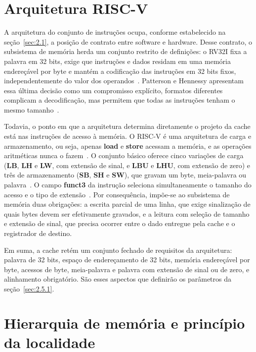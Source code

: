 \section{Arquitetura RISC-V}\label{sec:2.3}

A arquitetura do conjunto de instruções ocupa, conforme estabelecido na seção~\ref{sec:2.1}, a posição de contrato entre software e hardware. Desse contrato, o subsistema de memória herda um conjunto restrito de definições: o RV32I fixa a palavra em 32 bits, exige que instruções e dados residam em uma memória endereçável por byte e mantém a codificação das instruções em 32 bits fixos, independentemente do valor dos operandos~\cite{patterson2020computer}. Patterson e Hennessy apresentam essa última decisão como um compromisso explícito, formatos diferentes complicam a decodificação, mas permitem que todas as instruções tenham o mesmo tamanho~\cite{patterson2020computer}.

Todavia, o ponto em que a arquitetura determina diretamente o projeto da cache está nas instruções de acesso à memória. O RISC-V é uma arquitetura de carga e armazenamento, ou seja, apenas \textbf{load} e \textbf{store} acessam a memória, e as operações aritméticas nunca o fazem~\cite{patterson2020computer}. O conjunto básico oferece cinco variações de carga (\textbf{LB}, \textbf{LH} e \textbf{LW}, com extensão de sinal, e \textbf{LBU} e \textbf{LHU}, com extensão de zero) e três de armazenamento (\textbf{SB}, \textbf{SH} e \textbf{SW}), que gravam um byte, meia-palavra ou palavra~\cite{patterson2020computer}. O campo \textbf{funct3} da instrução seleciona simultaneamente o tamanho do acesso e o tipo de extensão~\cite{patterson2020computer}. Por consequência, impõe-se ao subsistema de memória duas obrigações: a escrita parcial de uma linha, que exige sinalização de quais bytes devem ser efetivamente gravados, e a leitura com seleção de tamanho e extensão de sinal, que precisa ocorrer entre o dado entregue pela cache e o registrador de destino.

Em suma, a cache retém um conjunto fechado de requisitos da arquitetura: palavra de 32 bits, espaço de endereçamento de 32 bits, memória endereçável por byte, acessos de byte, meia-palavra e palavra com extensão de sinal ou de zero, e alinhamento obrigatório. São esses aspectos que definirão os parâmetros da seção~\ref{sec:2.5.1}.

\section{Hierarquia de memória e princípio da localidade}\label{sec:2.4}

